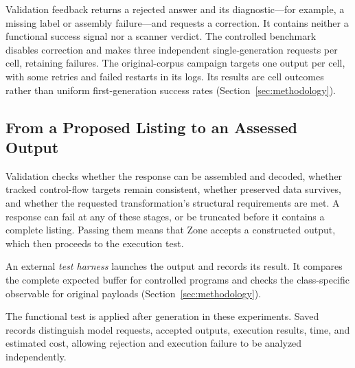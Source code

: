 Validation feedback returns a rejected answer and its diagnostic---for
example, a missing label or assembly failure---and requests a correction.
It contains neither a functional success signal nor a scanner verdict.
The controlled benchmark disables correction and makes three independent
single-generation requests per cell, retaining failures. The original-corpus
campaign targets one output per cell, with some retries and failed
restarts in its logs. Its results are cell outcomes rather than uniform
first-generation success rates (Section~\ref{sec:methodology}).

\subsection{From a Proposed Listing to an Assessed Output}
Validation checks whether the response can be assembled and decoded,
whether tracked control-flow targets remain consistent, whether preserved
data survives, and whether the requested transformation's structural
requirements are met. A response can fail at any of these stages, or be
truncated before it contains a complete listing. Passing them means that
Zone accepts a constructed output, which then proceeds to the execution test.

An external \emph{test harness} launches the output and records its result.
It compares the complete expected buffer for controlled programs and
checks the class-specific observable for original payloads
(Section~\ref{sec:methodology}).


The functional test is applied after generation in these experiments. Saved records distinguish model requests, accepted outputs,
execution results, time, and estimated cost, allowing rejection and execution
failure to be analyzed independently.
